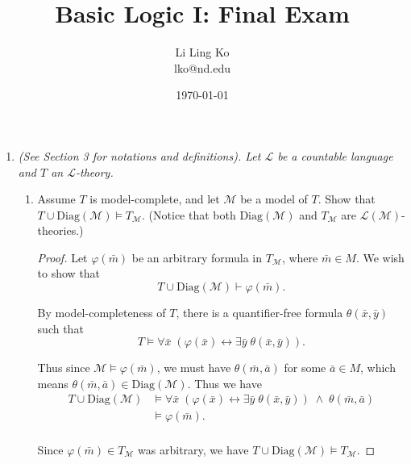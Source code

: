 \documentclass{article}
\begin{document}
\title{Basic Logic I: Final Exam}
\author{Li Ling Ko\\ lko@nd.edu}
\date{\today}
\maketitle

\begin{enumerate}[label={\bf Q\arabic*:}]
  \item \it (See Section 3 for notations and definitions). Let
    $\mathcal{L}$ be a countable language and $T$ an $\mathcal{L}$-theory.

    \begin{enumerate}[label={\bf(\arabic*)}]
      \item Assume $T$ is model-complete, and let $\mathcal{M}$ be a model
        of $T$. Show that $T\cup\text{Diag}(\mathcal{M})\models
        T_\mathcal{M}$. (Notice that both $\text{Diag}(\mathcal{M})$ and
        $T_\mathcal{M}$ are $\mathcal{L}(\mathcal{M})$-theories.)

        \begin{proof}
          Let $\varphi(\bar{m})$ be an arbitrary formula in
          $T_\mathcal{M}$, where $\bar{m}\in M$. We wish to show that
          \[T\cup\text{Diag}(\mathcal{M})\vdash \varphi(\bar{m}).\]

          By model-completeness of $T$, there is a quantifier-free formula
          $\theta(\bar{x},\bar{y})$ such that
          \[T\models \forall\bar{x}\; (\varphi(\bar{x})\leftrightarrow
            \exists\bar{y}\; \theta(\bar{x},\bar{y})).\]

          Thus since $\mathcal{M}\models\varphi(\bar{m})$, we must have
          $\theta(\bar{m},\bar{a})$ for some $\bar{a}\in M$, which means
          $\theta(\bar{m},\bar{a})\in\text{Diag}(\mathcal{M})$. Thus we
          have
          \begin{align*}
            T\cup\text{Diag}(\mathcal{M}) &\models \forall\bar{x}\;
              (\varphi(\bar{x})\leftrightarrow \exists\bar{y}\;
              \theta(\bar{x},\bar{y}))\; \wedge\; \theta(\bar{m},\bar{a})
              \\
              &\models \varphi(\bar{m}). \\
          \end{align*}

          Since $\varphi(\bar{m})\in T_\mathcal{M}$ was arbitrary, we have
          $T\cup\text{Diag}(\mathcal{M})\models T_\mathcal{M}$.
        \end{proof}


\end{enumerate}
\end{enumerate}
\end{document}
